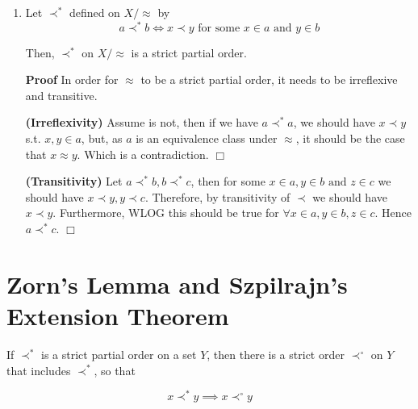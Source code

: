 \documentclass{article}
\theoremstyle{definition}
\def\tand{\text{ and }}
\begin{document}
\begin{enumerate}
{\bf Proof (ii)} Again, by theorem 3.1, we have 4 possible cases

\begin{itemize}
\item[] Case 1) $z\prec x$. By transitivity of $\prec$, it implies $y\prec x$. A contradiction.
\item[] Case 2) $x\approx z$. By symmetry and transitivity of $\approx$, it implies that $y\approx z$. A contradiction.
\item[] Case 3) $x\sim z$. By definition it would imply $y\sim z$. A contradiction.
\item[] Case 4) $x\prec z$. Therefore, as 1 to 3 are false, it must be the case that this is true. $\Box$
\end{itemize}

\item Let $\prec^*$ defined on $X/\approx$ by
\begin{equation*}
a\prec^* b\iff x\prec y\text{ for some $x\in a$ and $y\in b$}
\end{equation*}

Then, $\prec^*$ on $X/\approx$ is a strict partial order.

{\bf Proof} In order for $\approx$ to be a strict partial order, it needs to be irreflexive and transitive.

{\bf (Irreflexivity)} Assume is not, then if we have $a\prec^*a$, we should have $x\prec y$ s.t. $x,y\in a$, but, as $a$ is an equivalence class under $\approx$, it should be the case that $x\approx y$. Which is a contradiction. $\Box$

{\bf (Transitivity)} Let $a\prec^*b,b\prec^*c$, then for some $x\in a,y\in b\tand z\in c$ we should have $x\prec y,y\prec c$. Therefore, by transitivity of $\prec$ we should have $x\prec y$. Furthermore, WLOG this should be true for $\forall x\in a,y\in b,z\in c$. Hence $a\prec^* c$. $\Box$
\end{enumerate}

\section{Zorn's Lemma and Szpilrajn's Extension Theorem}

 If $\prec^*$ is a strict partial order on a set $Y$, then there is a strict order $\prec^\circ$ on $Y$ that includes $\prec^*$, so that

\begin{equation*}
x\prec^* y\implies x\prec^\circ y
\end{equation*}
\end{document}
